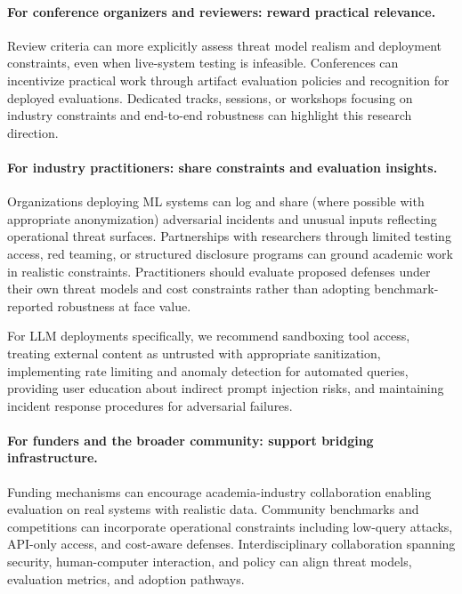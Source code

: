 \documentclass[11pt,a4paper]{article}
\begin{document}
\paragraph{For conference organizers and reviewers: reward practical relevance.}
Review criteria can more explicitly assess threat model realism and deployment constraints, even when live-system testing is infeasible. Conferences can incentivize practical work through artifact evaluation policies and recognition for deployed evaluations. Dedicated tracks, sessions, or workshops focusing on industry constraints and end-to-end robustness can highlight this research direction.

\paragraph{For industry practitioners: share constraints and evaluation insights.}
Organizations deploying ML systems can log and share (where possible with appropriate anonymization) adversarial incidents and unusual inputs reflecting operational threat surfaces. Partnerships with researchers through limited testing access, red teaming, or structured disclosure programs can ground academic work in realistic constraints. Practitioners should evaluate proposed defenses under their own threat models and cost constraints rather than adopting benchmark-reported robustness at face value.

For LLM deployments specifically, we recommend sandboxing tool access, treating external content as untrusted with appropriate sanitization, implementing rate limiting and anomaly detection for automated queries, providing user education about indirect prompt injection risks, and maintaining incident response procedures for adversarial failures.

\paragraph{For funders and the broader community: support bridging infrastructure.}
Funding mechanisms can encourage academia-industry collaboration enabling evaluation on real systems with realistic data. Community benchmarks and competitions can incorporate operational constraints including low-query attacks, API-only access, and cost-aware defenses. Interdisciplinary collaboration spanning security, human-computer interaction, and policy can align threat models, evaluation metrics, and adoption pathways.

\end{document}
